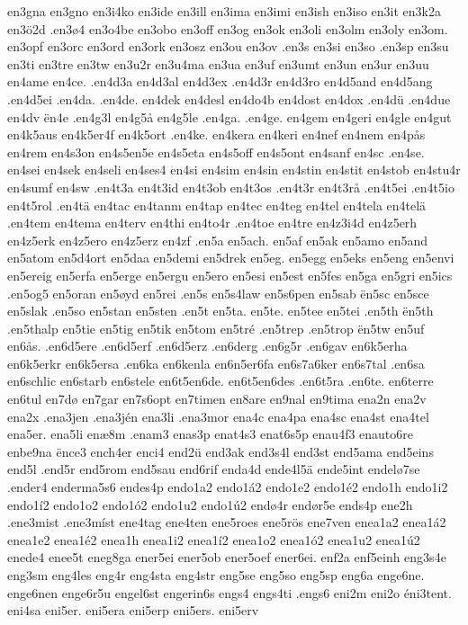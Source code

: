 en3gna
en3gno
en3i4ko
en3ide
en3ill
en3ima
en3imi
en3ish
en3iso
en3it
en3k2a
en3ö2d
.en3ø4
en3o4be
en3obo
en3off
en3og
en3ok
en3oli
en3olm
en3oly
en3om.
en3opf
en3orc
en3ord
en3ork
en3osz
en3ou
en3ov
.en3s
en3si
en3so
.en3sp
en3su
en3ti
en3tre
en3tw
en3u2r
en3u4ma
en3ua
en3uf
en3umt
en3un
en3ur
en3uu
en4ame
en4ce.
.en4d3a
en4d3al
en4d3ex
.en4d3r
en4d3ro
en4d5and
en4d5ang
.en4d5ei
.en4da.
.en4de.
en4dek
en4desl
en4do4b
en4dost
en4dox
.en4dü
.en4due
en4dv
ën4e
.en4g3l
en4g5å
en4g5le
.en4ga.
.en4ge.
en4gem
en4geri
en4gle
en4gut
en4k5aus
en4k5er4f
en4k5ort
.en4ke.
en4kera
en4keri
en4nef
en4nem
en4pås
en4rem
en4s3on
en4s5en5e
en4s5eta
en4s5off
en4s5ont
en4sanf
en4sc
.en4se.
en4sei
en4sek
en4seli
en4ses4
en4si
en4sim
en4sin
en4stin
en4stit
en4stob
en4stu4r
en4sumf
en4sw
.en4t3a
en4t3id
en4t3ob
en4t3os
.en4t3r
en4t3rå
.en4t5ei
.en4t5io
en4t5rol
.en4tä
en4tac
en4tanm
en4tap
en4tec
en4teg
en4tel
en4tela
en4telä
.en4tem
en4tema
en4terv
en4thi
en4to4r
.en4toe
en4tre
en4z3i4d
en4z5erh
en4z5erk
en4z5ero
en4z5erz
en4zf
.en5a
en5ach.
en5af
en5ak
en5amo
en5and
en5atom
en5d4ort
en5daa
en5demi
en5drek
en5eg.
en5egg
en5eks
en5eng
en5envi
en5ereig
en5erfa
en5erge
en5ergu
en5ero
en5esi
en5est
en5fes
en5ga
en5gri
en5ics
.en5og5
en5oran
en5øyd
en5rei
.en5s
en5s4law
en5s6pen
en5sab
ën5sc
en5sce
en5slak
.en5so
en5stan
en5sten
.en5t
en5ta.
en5te.
en5tee
en5tei
.en5th
ën5th
.en5thalp
en5tie
en5tig
en5tik
en5tom
en5tré
.en5trep
.en5trop
ën5tw
en5uf
en6ås.
.en6d5ere
.en6d5erf
.en6d5erz
.en6derg
.en6g5r
.en6gav
en6k5erha
en6k5erkr
en6k5ersa
.en6ka
en6kenla
en6n5er6fa
en6s7a6ker
en6s7tal
.en6sa
en6schlic
en6starb
en6stele
en6t5en6de.
en6t5en6des
.en6t5ra
.en6te.
en6terre
en6tul
en7dø
en7gar
en7s6opt
en7timen
en8are
en9nal
en9tima
ena2n
ena2v
ena2x
.ena3jen
.ena3jén
ena3li
.ena3mor
ena4c
ena4pa
ena4sc
ena4st
ena4tel
ena5er.
ena5li
enæ8m
.enam3
enas3p
enat4s3
enat6s5p
enau4f3
enauto6re
enbe9na
ënce3
ench4er
enci4
end2ü
end3ak
end3s4l
end3st
end5ama
end5eins
end5l
.end5r
end5rom
end5sau
end6rif
enda4d
ende4l5ä
ende5int
endelø7se
.ender4
enderma5s6
endes4p
endo1a2
endo1á2
endo1e2
endo1é2
endo1h
endo1i2
endo1í2
endo1o2
endo1ó2
endo1u2
endo1ú2
endø4r
endør5e
ends4p
ene2h
.ene3mist
.ene3míst
ene4tag
ene4ten
ene5roes
ene5rös
ene7ven
enea1a2
enea1á2
enea1e2
enea1é2
enea1h
enea1i2
enea1í2
enea1o2
enea1ó2
enea1u2
enea1ú2
enede4
enee5t
eneg8ga
ener5ei
ener5ob
ener5oef
ener6ei.
enf2a
enf5einh
eng3s4e
eng3sm
eng4les
eng4r
eng4sta
eng4str
eng5se
eng5so
eng5sp
eng6a
enge6ne.
enge6nen
enge6r5u
engel6st
engerin6s
engs4
engs4ti
.engs6
eni2m
eni2o
éni3tent.
eni4sa
eni5er.
eni5era
eni5erp
eni5ers.
eni5erv
